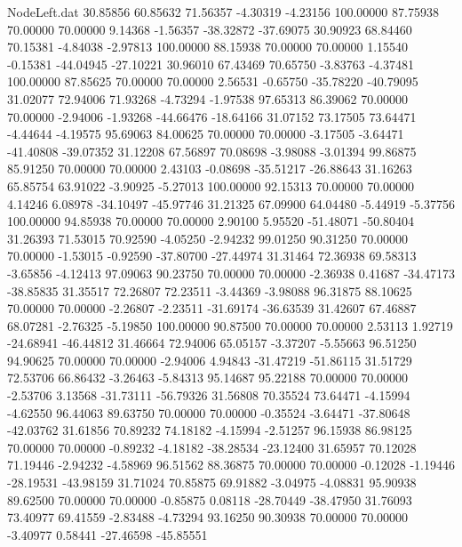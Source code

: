 \begin{filecontents}{NodeLeft.dat}
  30.85856   60.85632   71.56357    -4.30319   -4.23156  100.00000   87.75938   70.00000   70.00000    9.14368   -1.56357  -38.32872  -37.69075
  30.90923   68.84460   70.15381    -4.84038   -2.97813  100.00000   88.15938   70.00000   70.00000    1.15540   -0.15381  -44.04945  -27.10221
  30.96010   67.43469   70.65750    -3.83763   -4.37481  100.00000   87.85625   70.00000   70.00000    2.56531   -0.65750  -35.78220  -40.79095
  31.02077   72.94006   71.93268    -4.73294   -1.97538   97.65313   86.39062   70.00000   70.00000   -2.94006   -1.93268  -44.66476  -18.64166
  31.07152   73.17505   73.64471    -4.44644   -4.19575   95.69063   84.00625   70.00000   70.00000   -3.17505   -3.64471  -41.40808  -39.07352
  31.12208   67.56897   70.08698    -3.98088   -3.01394   99.86875   85.91250   70.00000   70.00000    2.43103   -0.08698  -35.51217  -26.88643
  31.16263   65.85754   63.91022    -3.90925   -5.27013  100.00000   92.15313   70.00000   70.00000    4.14246    6.08978  -34.10497  -45.97746
  31.21325   67.09900   64.04480    -5.44919   -5.37756  100.00000   94.85938   70.00000   70.00000    2.90100    5.95520  -51.48071  -50.80404
  31.26393   71.53015   70.92590    -4.05250   -2.94232   99.01250   90.31250   70.00000   70.00000   -1.53015   -0.92590  -37.80700  -27.44974
  31.31464   72.36938   69.58313    -3.65856   -4.12413   97.09063   90.23750   70.00000   70.00000   -2.36938    0.41687  -34.47173  -38.85835
  31.35517   72.26807   72.23511    -3.44369   -3.98088   96.31875   88.10625   70.00000   70.00000   -2.26807   -2.23511  -31.69174  -36.63539
  31.42607   67.46887   68.07281    -2.76325   -5.19850  100.00000   90.87500   70.00000   70.00000    2.53113    1.92719  -24.68941  -46.44812
  31.46664   72.94006   65.05157    -3.37207   -5.55663   96.51250   94.90625   70.00000   70.00000   -2.94006    4.94843  -31.47219  -51.86115
  31.51729   72.53706   66.86432    -3.26463   -5.84313   95.14687   95.22188   70.00000   70.00000   -2.53706    3.13568  -31.73111  -56.79326
  31.56808   70.35524   73.64471    -4.15994   -4.62550   96.44063   89.63750   70.00000   70.00000   -0.35524   -3.64471  -37.80648  -42.03762
  31.61856   70.89232   74.18182    -4.15994   -2.51257   96.15938   86.98125   70.00000   70.00000   -0.89232   -4.18182  -38.28534  -23.12400
  31.65957   70.12028   71.19446    -2.94232   -4.58969   96.51562   88.36875   70.00000   70.00000   -0.12028   -1.19446  -28.19531  -43.98159
  31.71024   70.85875   69.91882    -3.04975   -4.08831   95.90938   89.62500   70.00000   70.00000   -0.85875    0.08118  -28.70449  -38.47950
  31.76093   73.40977   69.41559    -2.83488   -4.73294   93.16250   90.30938   70.00000   70.00000   -3.40977    0.58441  -27.46598  -45.85551

\end{filecontents}
